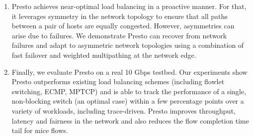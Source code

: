 \begin{enumerate}
\item Presto achieves near-optimal load balancing in a proactive manner. For that, it leverages symmetry in 
the network topology to ensure that all paths between a pair of hosts are equally congested. 
However, asymmetries can arise due to failures. We demonstrate Presto can recover from network failures and adapt to asymmetric 
network topologies using a combination of fast failover and weighted multipathing at the network edge.


\item Finally, we evaluate Presto on a real 10 Gbps testbed. Our experiments show Presto
outperforms existing load balancing schemes (including flowlet switching, ECMP, MPTCP) and 
is able to track the performance of a single, non-blocking switch (an optimal case) within a few percentage points
over a variety of workloads, including trace-driven. Presto improves throughput, latency and fairness in the network and 
also reduces the flow completion time tail for mice flows.

\end{enumerate}

\fi

